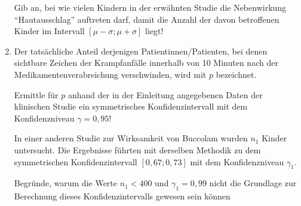 \begin{langesbeispiel}
\begin{enumerate}
Gib an, bei wie vielen Kindern in der erwähnten Studie die Nebenwirkung "`Hautausschlag"' auftreten darf, damit die Anzahl der davon betroffenen Kinder im Intervall $[\mu-\sigma;\mu+\sigma]$ liegt!

\item Der tatsächliche Anteil derjenigen Patientinnen/Patienten, bei denen sichtbare Zeichen der Krampfanfälle innerhalb von 10 Minuten nach der Medikamentenverabreichung verschwinden, wird mit $p$ bezeichnet. 

Ermittle für $p$ anhand der in der Einleitung angegebenen Daten der klinischen Studie ein symmetrisches Konfidenzintervall mit dem Konfidenzniveau $\gamma=0,95$! \leer

 In einer anderen Studie zur Wirksamkeit von Buccolam wurden $n_1$ Kinder untersucht. Die Ergebnisse führten mit derselben Methodik zu dem symmetrischen Konfidenzintervall  $[0,67; 0,73]$ mit dem Konfidenzniveau $\gamma_1$. 

Begründe, warum die Werte  $n_1<400$  und  $\gamma_1=0,99$  nicht die Grundlage zur Berechnung dieses Konfidenzintervalls gewesen sein können

\end{enumerate}

\end{langesbeispiel}
